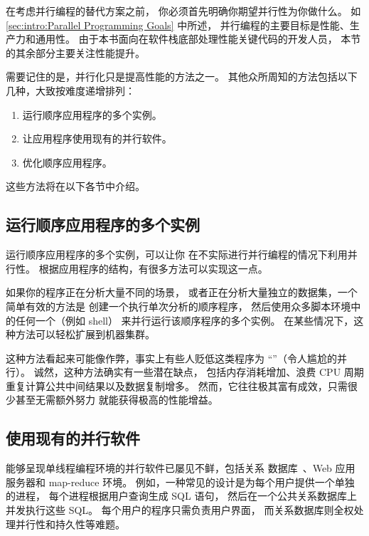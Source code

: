 在考虑并行编程的替代方案之前，
你必须首先明确你期望并行性为你做什么。
如 \cref{sec:intro:Parallel Programming Goals} 中所述，
并行编程的主要目标是性能、生产力和通用性。
由于本书面向在软件栈底部处理性能关键代码的开发人员，
本节的其余部分主要关注性能提升。

需要记住的是，并行化只是提高性能的方法之一。
其他众所周知的方法包括以下几种，大致按难度递增排列：

\begin{enumerate}
\item	运行顺序应用程序的多个实例。
\item	让应用程序使用现有的并行软件。
\item	优化顺序应用程序。
\end{enumerate}

这些方法将在以下各节中介绍。

\subsection{运行顺序应用程序的多个实例}
\label{sec:intro:Multiple Instances of a Sequential Application}

运行顺序应用程序的多个实例，可以让你
在不实际进行并行编程的情况下利用并行性。
根据应用程序的结构，有很多方法可以实现这一点。

如果你的程序正在分析大量不同的场景，
或者正在分析大量独立的数据集，一个简单有效的方法是
创建一个执行单次分析的顺序程序，
然后使用众多脚本环境中的任何一个（例如  shell）
来并行运行该顺序程序的多个实例。
在某些情况下，这种方法可以轻松扩展到机器集群。

这种方法看起来可能像作弊，事实上有些人贬低这类程序为
``''（令人尴尬的并行）。
诚然，这种方法确实有一些潜在缺点，
包括内存消耗增加、浪费 CPU 周期重复计算公共中间结果以及数据复制增多。
然而，它往往极其富有成效，只需很少甚至无需额外努力
就能获得极高的性能增益。

\subsection{使用现有的并行软件}
\label{sec:intro:Use Existing Parallel Software}

能够呈现单线程编程环境的并行软件已屡见不鲜，包括关系
数据库~\cite{Date82}、Web 应用服务器和 map-reduce 环境。
例如，一种常见的设计是为每个用户提供一个单独的进程，
每个进程根据用户查询生成 SQL 语句，
然后在一个公共关系数据库上并发执行这些 SQL。
每个用户的程序只需负责用户界面，
而关系数据库则全权处理并行性和持久性等难题。

